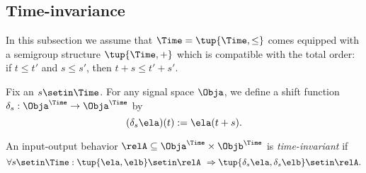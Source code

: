 
\subsection{Time-invariance}

In this subsection we assume that $\Time = \tup{\Time, \leq}$ comes equipped with a semigroup structure $\tup{\Time, +}$ which is compatible with the total order: if $t \leq t'$ and $s \leq s'$, then $t + s \leq t' + s'$.

Fix an $s \setin \Time$.
For any signal space $\Obja$, we define a shift function $\delta_s: \Obja^\Time \to \Obja^\Time$ by
\begin{equation}
    (\delta_s \ela)(t) := \ela(t + s).
\end{equation}

\begin{definition}
    An input-output behavior $\relA \subseteq \Obja^\Time \times \Objb^\Time$ is \emph{time-invariant} if
    \begin{equation}
        \forall s \setin \Time: \tup{\ela, \elb} \setin \relA  \ \Rightarrow \tup{\delta_s \ela, \delta_s \elb} \setin \relA.
    \end{equation}
\end{definition}


